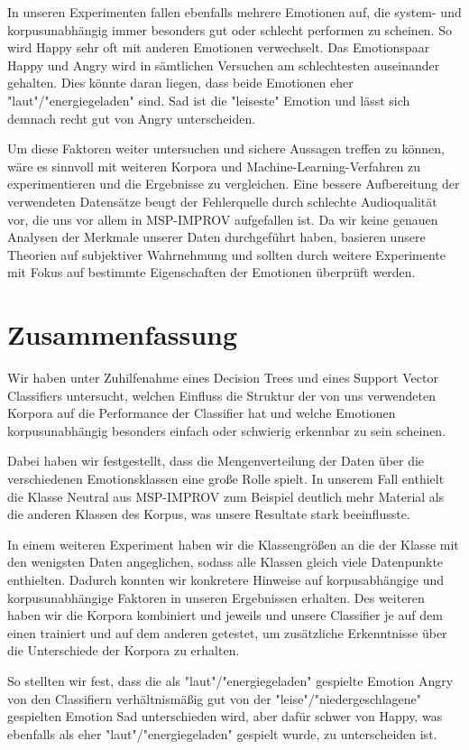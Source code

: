 \documentclass{article} %
\begin{document}
In unseren Experimenten fallen ebenfalls mehrere Emotionen auf, die system- und korpusunabhängig immer besonders gut oder schlecht performen zu scheinen. So wird Happy sehr oft mit anderen Emotionen verwechselt. Das Emotionspaar Happy und Angry wird in sämtlichen Versuchen am schlechtesten auseinander gehalten. Dies könnte daran liegen, dass beide Emotionen eher "laut"/"energiegeladen" sind. Sad ist die "leiseste" Emotion und lässt sich demnach recht gut von Angry unterscheiden. 

Um diese Faktoren weiter untersuchen und sichere Aussagen treffen zu können, wäre es sinnvoll mit weiteren Korpora und Machine-Learning-Verfahren zu experimentieren und die Ergebnisse zu vergleichen. Eine bessere Aufbereitung der verwendeten Datensätze beugt der Fehlerquelle durch schlechte Audioqualität vor, die uns vor allem in MSP-IMPROV aufgefallen ist. Da wir keine genauen Analysen der Merkmale unserer Daten durchgeführt haben, basieren unsere Theorien auf subjektiver Wahrnehmung und sollten durch weitere Experimente mit Fokus auf bestimmte Eigenschaften der Emotionen überprüft werden.
\section{Zusammenfassung}
Wir haben unter Zuhilfenahme eines Decision Trees und eines Support Vector Classifiers untersucht, welchen Einfluss die Struktur der von uns verwendeten Korpora auf die Performance der Classifier hat und welche Emotionen korpusunabhängig besonders einfach oder schwierig erkennbar zu sein scheinen. 

Dabei haben wir festgestellt, dass die Mengenverteilung der Daten über die verschiedenen Emotionsklassen eine große Rolle spielt. In unserem Fall enthielt die Klasse Neutral aus MSP-IMPROV zum Beispiel deutlich mehr Material als die anderen Klassen des Korpus, was unsere Resultate stark beeinflusste. 

In einem weiteren Experiment haben wir die Klassengrößen an die der Klasse mit den wenigsten Daten angeglichen, sodass alle Klassen gleich viele Datenpunkte enthielten. Dadurch konnten wir konkretere Hinweise auf korpusabhängige und korpusunabhängige Faktoren in unseren Ergebnissen erhalten. Des weiteren haben wir die Korpora kombiniert und jeweils und unsere Classifier je auf dem einen trainiert und auf dem anderen getestet, um zusätzliche Erkenntnisse über die Unterschiede der Korpora zu erhalten. 

So stellten wir fest, dass die  als "laut"/"energiegeladen" gespielte Emotion Angry von den Classifiern verhältnismäßig gut von der "leise"/"niedergeschlagene" gespielten Emotion Sad unterschieden wird, aber dafür schwer von Happy, was ebenfalls als eher "laut"/"energiegeladen" gespielt wurde, zu unterscheiden ist. 
\end{document}

